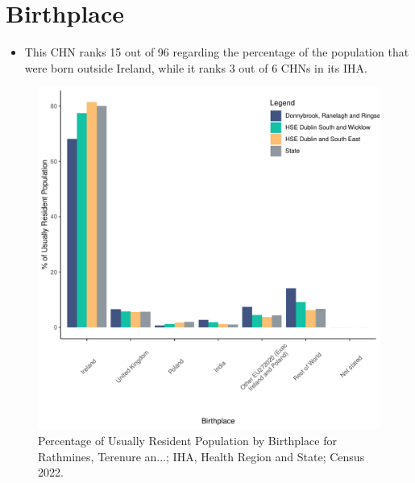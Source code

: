 \documentclass{article}
\begin{document}
\section{Birthplace}\label{sect:Birth}
\begin{itemize}
\item This CHN ranks  15 out of 96 regarding the percentage of the population that were born outside Ireland, while it ranks  3 out of 6 CHNs in its IHA.
\end{itemize}
\begin{figure}[H]
	\centering
	\includegraphics[width = 130mm]{../figures/BirthED.pdf}
	\caption{Percentage of Usually Resident Population by Birthplace for Rathmines, Terenure an...; IHA, Health Region and State; Census 2022.}
	\label{fig:vbnv}
	\end{figure}
	
\end{document}
